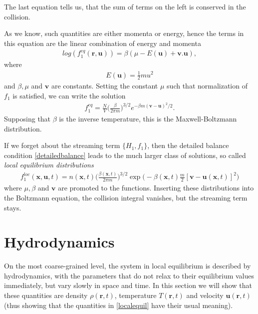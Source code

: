 The last equation tells us, that the sum of terms on the left is conserved in the collision.

As we know, such quantities are either momenta or energy, hence the terms in this equation are the linear combination of energy and momenta
\begin{align*}
log(f_1^{eq}(\bm{r},\bm{u})) = \beta(\mu - E(\bm{u}) + \bm{v}. \bm{u}),
\end{align*}
where
\begin{align*}
E(\bm{u}) = \frac{1}{2} m u^2
\end{align*}
and $\beta,\mu$ and $\bm{v}$ are constants.
Setting the constant $\mu$ such that normalization of $f_1$ is satisfied, we can write the solution
\begin{align} \label{mbt}
f_1^{eq} = \frac{N}{V}\big(\frac{\beta}{2\pi m}\big)^{3/2} e^{-\beta m (\bm{v} - \bm{u})^2/2}.
\end{align}
Supposing that $\beta$ is the inverse temperature, this is the Maxwell-Boltzmann distribution.

If we forget about the streaming term $\big\{ H_1, f_1 \big\}$, then the detailed balance condition \ref{detailedbalance} leads to the much larger class of solutions, so called \textit{local equilibrium distributions}
\begin{align} \label{localequil}
f_1^{loc}(\bm{x},\bm{u},t) = n(\bm{x},t) \Big(\frac{\beta(\bm{x},t)}{2\pi m}\Big)^{3/2} \exp \big(-\beta(\bm{x},t)\frac{m}{2}[\bm{v} - \bm{u}(\bm{x},t)]^2 \big)
\end{align}
where $\mu,\beta$ and $\bm{v}$ are promoted to the functions.
Inserting these distributions into the Boltzmann equation, the collision integral vanishes, but the streaming term stays.

\section{Hydrodynamics}
On the most coarse-grained level, the system in local equilibrium is described by hydrodynamics, with the parameters that do not relax to their equilibrium values immediately, but vary slowly in space and time.
In this section we will show that these quantities are density $\rho(\bm{r},t)$, temperature $T(\bm{r},t)$ and velocity $\bm{u}(\bm{r},t)$ (thus showing that the quantities in \ref{localequil} have their usual meaning).

